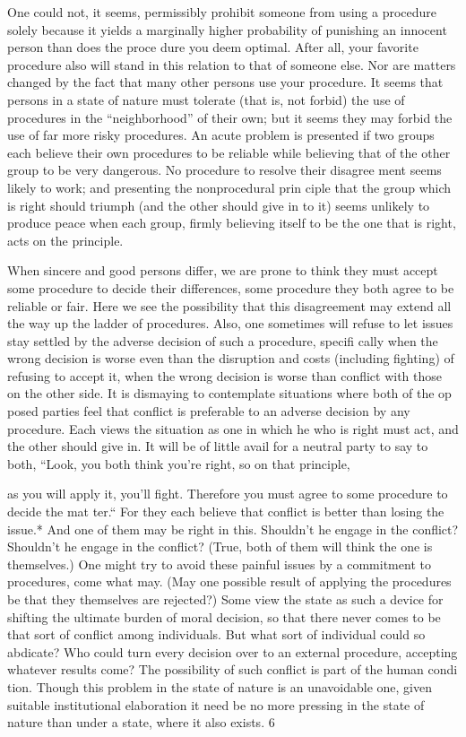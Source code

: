 \documentclass[11pt,openany]{book}
\begin{document}
One could not, it seems, permissibly prohibit someone from using a procedure solely because it yields a marginally higher probability of punishing an innocent person than does the proce dure you deem optimal. After all, your favorite procedure also will stand in this relation to that of someone else. Nor are matters changed by the fact that many other persons use your procedure. It seems that persons in a state of nature must tolerate (that is, not forbid) the use of procedures in the ``neighborhood'' of their own; but it seems they may forbid the use of far more risky procedures. An acute problem is presented if two groups each believe their own procedures to be reliable while believing that of the other group to be very dangerous. No procedure to resolve their disagree ment seems likely to work; and presenting the nonprocedural prin ciple that the group which is right should triumph (and the other should give in to it) seems unlikely to produce peace when each group, firmly believing itself to be the one that is right, acts on the principle. 

When sincere and good persons differ, we are prone to think they must accept some procedure to decide their differences, some procedure they both agree to be reliable or fair. Here we see the possibility that this disagreement may extend all the way up the ladder of procedures. Also, one sometimes will refuse to let issues stay settled by the adverse decision of such a procedure, specifi cally when the wrong decision is worse even than the disruption and costs (including fighting) of refusing to accept it, when the wrong decision is worse than conflict with those on the other side. It is dismaying to contemplate situations where both of the op posed parties feel that conflict is preferable to an adverse decision by any procedure. Each views the situation as one in which he who is right must act, and the other should give in. It will be of little avail for a neutral party to say to both, ``Look, you both think you're right, so on that principle, 

as you will apply it, you'll fight. Therefore you must agree to some procedure to decide the mat ter.`` For they each believe that conflict is better than losing the issue.* And one of them may be right in this. Shouldn't he engage in the conflict? Shouldn't he engage in the conflict? (True, both of them will think the one is themselves.) One might try to avoid these painful issues by a commitment to procedures, come what may. (May one possible result of applying the procedures be that they themselves are rejected?) Some view the state as such a device for shifting the ultimate burden of moral decision, so that there never comes to be that sort of conflict among individuals. But what sort of individual could so abdicate? Who could turn every decision over to an external procedure, accepting whatever results come? The possibility of such conflict is part of the human condi tion. Though this problem in the state of nature is an unavoidable one, given suitable institutional elaboration it need be no more pressing in the state of nature than under a state, where it also exists. 6 
\end{document}
